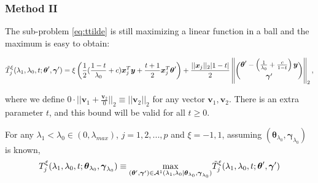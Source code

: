 \subsubsection{Method II}

The sub-problem \eqref{eq:ttilde} is still maximizing a linear function in a ball and the maximum is easy to obtain:

\begin{gather}
    \label{eq:ttildexi.alt}
    \begin{aligned}
        \Tilde{T}^\xi_j(\lambda_1,\lambda_0,t;\boldsymbol\theta',\boldsymbol\gamma')=\xi\left( \frac{1}{2}(\frac{1-t}{\lambda_0}+c)\boldsymbol x_j^T\boldsymbol y+\frac{t+1}{2}\boldsymbol x_j^T\boldsymbol\theta'\right)+\frac{||\boldsymbol x_j||_2|1-t|}{2}\left\Vert\binom{\boldsymbol\theta'-\left(\frac{1}{\lambda_0}+\frac{c}{1-t}\right)\boldsymbol y}{\boldsymbol\gamma'}\right\Vert_2,\\
    \end{aligned}
\end{gather}

where we define $0\cdot||\boldsymbol v_1+\frac{\boldsymbol v_2}{0}||_2\equiv ||\boldsymbol v_2||_2$ for any vector $\boldsymbol v_1,\boldsymbol v_2$. There is an extra parameter $t$, and this bound will be valid for all $t\geq 0$.

\begin{theorem}
    \label{thm:2.2}
    For any $\lambda_1<\lambda_{0}\in (0,\lambda_{max})$, $j=1,2,...,p$ and $\xi=-1,1$, assuming $(\boldsymbol\theta_{\lambda_0},\boldsymbol\gamma_{\lambda_0})$ is known,
    \begin{gather}
        \begin{aligned}
            T^\xi_j(\lambda_1,\lambda_0,t;\boldsymbol\theta_{\lambda_0},\boldsymbol\gamma_{\lambda_0})&\equiv\underset{(\boldsymbol\theta',\boldsymbol\gamma')\in\mathcal{A}^1(\lambda_1,\lambda_0|\boldsymbol\theta_{\lambda_0},\boldsymbol\gamma_{\lambda_0})}{\mathrm{max}}\Tilde{T}^\xi_j(\lambda_1,\lambda_0,t;\boldsymbol\theta',\boldsymbol\gamma')\\
        \end{aligned}
    \end{gather}
\end{theorem}


